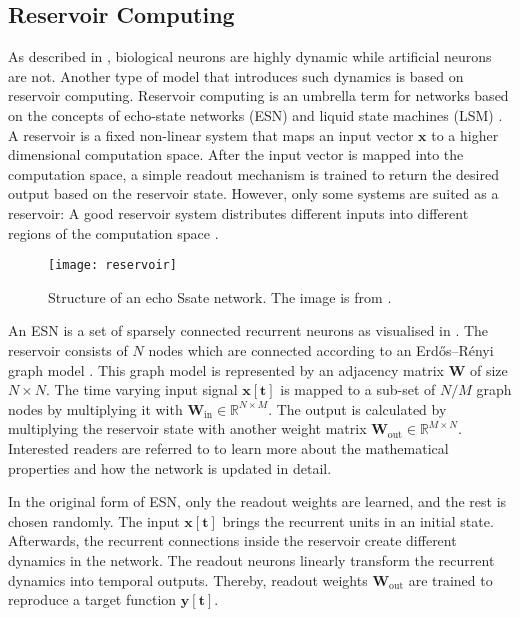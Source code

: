 \subsection{Reservoir Computing}
As described in , biological neurons are highly dynamic while artificial neurons are not.
Another type of model that introduces such dynamics is based on reservoir computing.
Reservoir computing is an umbrella term for networks based on the concepts of echo-state networks (ESN)  and liquid state machines (LSM) .
A reservoir is a fixed non-linear system that maps an input vector \(\boldsymbol{x}\) to a higher dimensional computation space.
After the input vector is mapped into the computation space, a simple readout mechanism is trained to return the desired output based on the reservoir state.
However, only some systems are suited as a reservoir:
A good reservoir system distributes different inputs into different regions of the computation space .
%
\begin{figure}[h]
    \centering
    \texttt{[image: reservoir]}
    \caption[Structure of an echo state network]{Structure of an echo Ssate network. The image is from .}
\end{figure}
%
An ESN is a set of sparsely connected recurrent neurons as visualised in .
The reservoir consists of \(N\) nodes which are connected according to an Erdős–Rényi graph model .
This graph model is represented by an adjacency matrix \(\boldsymbol{W}\) of size \(N \times N\).
The time varying input signal \(\boldsymbol{x[t]}\) is mapped to a sub-set of \(N/M\) graph nodes by multiplying it with \(\boldsymbol{W}_{\text{in}} \in \mathbb{R}^{N\times M}\).
The output is calculated by multiplying the reservoir state with another weight matrix \(\boldsymbol{W}_{\text{out}} \in \mathbb{R}^{M\times N}\).
Interested readers are referred to  to learn more about the mathematical properties and how the network is updated in detail.

In the original form of ESN, only the readout weights are learned, and the rest is chosen randomly.
The input \(\boldsymbol{x[t]}\) brings the recurrent units in an initial state.
Afterwards, the recurrent connections inside the reservoir create different dynamics in the network.
The readout neurons linearly transform the recurrent dynamics into temporal outputs.
Thereby, readout weights \(\boldsymbol{W}_{\text{out}}\) are trained to reproduce a target function \(\boldsymbol{y[t]}\).


